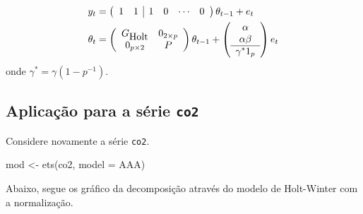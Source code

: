 \documentclass[
  letterpaper,
  DIV=11,
  numbers=noendperiod]{scrartcl}
\newenvironment{Shaded}{\begin{snugshade}}{\end{snugshade}}
\newcommand{\AttributeTok}[1]{\textcolor[rgb]{0.40,0.45,0.13}{#1}}
\newcommand{\DecValTok}[1]{\textcolor[rgb]{0.68,0.00,0.00}{#1}}
\newcommand{\FunctionTok}[1]{\textcolor[rgb]{0.28,0.35,0.67}{#1}}
\newcommand{\NormalTok}[1]{\textcolor[rgb]{0.00,0.23,0.31}{#1}}
\newcommand{\OtherTok}[1]{\textcolor[rgb]{0.00,0.23,0.31}{#1}}
\newcommand{\SpecialCharTok}[1]{\textcolor[rgb]{0.37,0.37,0.37}{#1}}
\newcommand{\StringTok}[1]{\textcolor[rgb]{0.13,0.47,0.30}{#1}}
\theoremstyle{definition}
\theoremstyle{definition}
\theoremstyle{plain}
\theoremstyle{plain}
\theoremstyle{remark}
\begin{document}
\begin{align}
y_t&=\left(\begin{array}{cc|cccc}1&1&1&0&\cdots&0\end{array}\right)\theta_{t-1}+e_t\\
\theta_t&=\left(\begin{array}{cc}G_{\hbox{Holt}} & 0_{2\times p}\\
0_{p\times 2} & P\end{array}\right)\theta_{t-1}+\left(\begin{array}{c}\alpha \\ \alpha\beta \\ \hline \gamma^*1_p \end{array}\right)e_t\end{align}
onde \(\gamma^*=\gamma(1-p^{-1})\).

\subsection{\texorpdfstring{Aplicação para a série
\texttt{co2}}{Aplicação para a série co2}}\label{aplicauxe7uxe3o-para-a-suxe9rie-co2}

Considere novamente a série \texttt{co2}.

\begin{Shaded}
\begin{Highlighting}[]
\NormalTok{mod }\OtherTok{\textless{}{-}} \FunctionTok{ets}\NormalTok{(co2, }\AttributeTok{model =} \StringTok{\textquotesingle{}AAA\textquotesingle{}}\NormalTok{)}
\end{Highlighting}
\end{Shaded}

Abaixo, segue os gráfico da decomposição através do modelo de
Holt-Winter com a normalização.

\begin{Shaded}
\end{Shaded}
\end{document}
